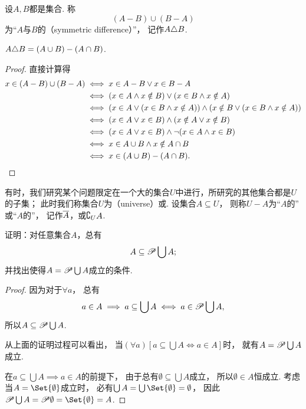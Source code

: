 \begin{definition}
设\(A,B\)都是集合.
称\begin{equation*}
	(A-B)\cup(B-A)
\end{equation*}为“\(A\)与\(B\)的（symmetric difference）”，
记作\(A \triangle B\).
\end{definition}

\begin{theorem}
\(A \triangle B = (A \cup B)-(A \cap B)\).
\begin{proof}
直接计算得
\begin{align*}
	x\in(A-B)\cup(B-A)
	&\iff x \in A-B \lor x \in B-A \\
	&\iff (x \in A \land x \notin B) \lor (x \in B \land x \notin A) \\
	&\iff (x \in A \lor (x \in B \land x \notin A)) \land (x \notin B \lor (x \in B \land x \notin A)) \\
	&\iff (x \in A \lor x \in B) \land (x \notin A \lor x \notin B) \\
	&\iff (x \in A \lor x \in B) \land \neg(x \in A \land x \in B) \\
	&\iff x \in A \cup B \land x \notin A \cap B \\
	&\iff x\in(A \cup B)-(A \cap B).
	\qedhere
\end{align*}
\end{proof}
\end{theorem}

有时，我们研究某个问题限定在一个大的集合\(U\)中进行，所研究的其他集合都是\(U\)的子集；
此时我们称集合\(U\)为（universe）或.
设集合\(A \subseteq U\)，
则称\(U-A\)为“\(A\)的”
或“\(A\)的”，
记作\(\SetComplementaryL{A}[U]\)，或\(\SetComplementaryC{A}[U]\).

\begin{example}
证明：对任意集合\(A\)，总有
\begin{equation}\label{equation:集合论.系的并的幂集包含系}
	A \subseteq \mathscr{P} \bigcup A;
\end{equation}
并找出使得\(A = \mathscr{P} \bigcup A\)成立的条件.
\begin{proof}
因为对于\(\forall a\)，
总有\begin{equation*}
	a \in A
	\implies
	a \subseteq \bigcup A
	\iff
	a \in \mathscr{P} \bigcup A,
\end{equation*}
所以\(A \subseteq \mathscr{P} \bigcup A\).

从上面的证明过程可以看出，
当\((\forall a)
[a \subseteq \bigcup A \iff a \in A]\)时，
就有\(A = \mathscr{P} \bigcup A\)成立.

在\(a \subseteq \bigcup A \implies a \in A\)的前提下，
由于总有\(\emptyset \subseteq \bigcup A\)成立，
所以\(\emptyset \in A\)恒成立.
考虑当\(A = \Set{\emptyset}\)成立时，
必有\(\bigcup A = \bigcup\Set{\emptyset} = \emptyset\)，
因此\(\Powerset \bigcup A = \Powerset \emptyset = \Set{\emptyset} = A\).
\end{proof}
\end{example}
